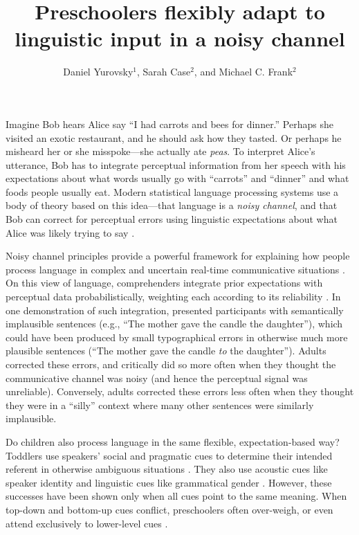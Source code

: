 \documentclass[man,floatsintext]{apa6}
\title{Preschoolers flexibly adapt to linguistic input in a noisy channel}
\author{Daniel Yurovsky$^1$, Sarah Case$^2$, and Michael C. Frank$^2$}
\affiliation{$^1$Department of Psychology, University of Chicago\\
    $^2$Department of Psychology, Stanford University}
\begin{document}
\maketitle

Imagine Bob hears Alice say ``I had carrots and bees for dinner.'' Perhaps she visited an exotic restaurant, and he should ask how they tasted. Or perhaps he misheard her or she misspoke---she actually ate \emph{peas}. To interpret Alice's utterance, Bob has to integrate perceptual information from her speech with his expectations about what words usually go with ``carrots'' and ``dinner'' and what foods people usually eat. Modern statistical language processing systems use a body of theory based on this idea---that language is a \emph{noisy channel}, and that Bob can correct for perceptual errors using linguistic expectations about what Alice was likely trying to say \cite{jelinek1976, shannon1948}.

Noisy channel principles provide a powerful framework for explaining how people process language in complex and uncertain real-time communicative situations \cite{clayards2008, levy2008, jaeger2010}. On this view of language, comprehenders integrate prior expectations with perceptual data probabilistically, weighting each according to its reliability \cite{ernst2002, jacobs1999}. In one demonstration of such integration,  presented participants with semantically implausible sentences (e.g., ``The mother gave the candle the daughter''), which could have been produced by small typographical errors in otherwise much more plausible sentences (``The mother gave the candle \emph{to} the daughter''). Adults corrected these errors, and critically did so more often when they thought the communicative channel was noisy (and hence the perceptual signal was unreliable). Conversely, adults corrected these errors less often when they thought they were in a ``silly'' context where many other sentences were similarly implausible.

Do children also process language in the same flexible, expectation-based way? Toddlers use speakers' social and pragmatic cues to determine their intended referent in otherwise ambiguous situations \cite{carpenter1998, clark2009}. They also use acoustic cues like speaker identity and linguistic cues like grammatical gender \cite{lew-williams2007, creel2012}. However, these successes have been shown only when all cues point to the same meaning. When top-down and bottom-up cues conflict, preschoolers often over-weigh, or even attend exclusively to lower-level cues \cite{trueswell1999,snedeker2004}.
\end{document}
